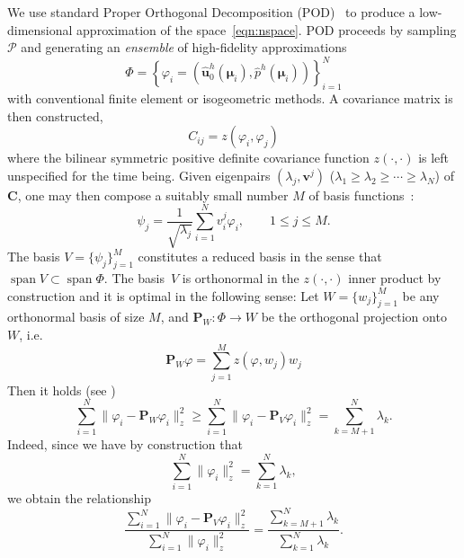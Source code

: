\documentclass[onecolumn, twoside, a4paper, 11pt]{article}
\begin{document}
We use standard Proper Orthogonal Decomposition (POD)~\cite{Chatterjee2000ipo,Quarteroni2016rbm} to produce
a low-dimensional approximation of the space~\eqref{eqn:nspace}. POD proceeds by sampling $\mathcal{P}$
and generating an \emph{ensemble} of high-fidelity approximations
%
\begin{equation}
\label{eqn:ensemble}
  \Phi = \left\{
    \varphi_i = (\hat{\bm u}^h_0(\bm \mu_i), \hat{p}^h(\bm \mu_i))
  \right\}_{i=1}^N
\end{equation}
%
with conventional finite element or isogeometric methods. A covariance matrix is then
constructed,
\begin{equation}
  \label{eqn:covmx}
  C_{ij} = z(\varphi_i, \varphi_j)
\end{equation}
where the bilinear symmetric positive definite covariance function
$z(\cdot,\cdot)$ is left unspecified for the time being. Given eigenpairs
$(\lambda_j, \bm v^j)$ ($\lambda_1\geq\lambda_2\geq\cdots\geq\lambda_N$)
of $\bm C$, one may then compose a suitably small number $M$
of basis functions~\cite[(6.10)]{Quarteroni2016rbm}:
%
\begin{equation}
  \label{eqn:spd}
  \psi_j = \frac{1}{\sqrt{\lambda_j}} \sum_{i=1}^N v^j_i \varphi_i,
  \qquad 1 \leq j \leq M.
\end{equation}
%
The basis $V=\{\psi_j\}_{j=1}^M$ constitutes a reduced basis in the sense
that $\operatorname{span}V\subset\operatorname{span}\Phi$. The basis~$V$ is orthonormal
in the $z(\cdot,\cdot)$ inner product by construction and it
is optimal in the following sense: Let
$W =\{ w_j\}_{j=1}^M$ be any orthonormal basis of size $M$, and
$\bm P_W:\Phi\to{}W$ be the orthogonal projection onto $W$, i.e.
%
\begin{equation}
  \bm P_W \varphi = \sum_{j=1}^M z(\varphi, w_j) w_j
\end{equation}
Then it holds (see \cite[Proposition 6.2]{Quarteroni2016rbm})
\begin{equation}
  \sum_{i=1}^N \| \varphi_i - \bm P_W \varphi_i \|_z^2 \geq
  \sum_{i=1}^N \| \varphi_i - \bm P_V \varphi_i \|_z^2 =
  \sum_{k=M+1}^N \lambda_k.
\end{equation}
Indeed, since we have by construction that
\begin{equation}
  \sum_{i=1}^N \| \varphi_i \|_z^2 = \sum_{k=1}^N \lambda_k,
\end{equation}
%
we obtain the relationship
%
\begin{equation}
  \frac{ \sum_{i=1}^N \| \varphi_i - \bm P_V \varphi_i \|_z^2 }{ \sum_{i=1}^N \| \varphi_i \|_z^2 }
  = \frac{ \sum_{k=M+1}^N \lambda_k }{ \sum_{k=1}^N \lambda_k }.
\end{equation}
\end{document}
